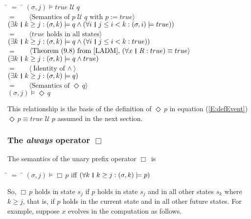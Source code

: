 \documentclass[fleqn, leqno]{article}
\newcommand{\lgap}{2pt}                             %
\newcommand{\mymathindent}{24pt}                    %
\newcommand{\Until}{\;\mathcal{U}\;}
\newcommand{\Event}{\Diamond\,}
\newcommand{\Always}{\Box\,}
\newcommand{\thedr}{\rule[-.25ex]{.32mm}{1.75ex}}   %
\newcommand{\dr}{\;\,\thedr\,\;}                    %
\newcommand{\rb}{:}                                 %
\newcommand{\all}{\forall}                          %
\newcommand{\ext}{\exists}                          %
\newcommand{\Gll} {\langle}                         %
\newcommand{\Ggg} {\rangle}                         %
\newcommand{\Hint}[1]     {\ \ \ $\Gll              \mbox{#1} \Ggg$ }   %
\begin{document}
\begin{tabbing}
\hspace{\mymathindent} \= $= \;$ \= \kill
	\> \>   $(\sigma, j) \models true\Until q$\\[\lgap]
	\> $=$  \>  \Hint{Semantics of $p\Until q$ with $p:=true$}\\[\lgap]
	\> \>   $(\ext k \dr k \ge j \rb (\sigma,k) \models q \land (\all i \dr j\le i < k \rb (\sigma,i) \models true))$\\[\lgap]
	\> $=$  \>  \Hint{$true$ holds in all states}\\[\lgap]
	\> \>   $(\ext k \dr k \ge j \rb (\sigma,k) \models q \land (\all i \dr j\le i < k \rb true))$\\[\lgap]
	\> $=$  \>  \Hint{Theorem (9.8) from \cite{LADM}, $(\all x\dr R\rb true)\equiv true$}\\[\lgap]
	\> \>   $(\ext k \dr k \ge j \rb (\sigma,k) \models q \land true)$\\[\lgap]
	\> $=$  \>  \Hint{Identity of $\land$}\\[\lgap]
	\> \>   $(\ext k \dr k \ge j \rb (\sigma,k) \models q)$\\[\lgap]
	\> $=$  \>  \Hint{Semantics of $\Event q$}\\[\lgap]
	\> \>   $(\sigma, j) \models \Event q$
\end{tabbing}

This relationship is the basis of the definition of $\Event p$ in equation (\ref{E:defEvent}) $\Event p \equiv true \Until p$
assumed in the next section.

\subsubsection*{The \textit{always} operator $\Always$}

The semantics of the unary prefix operator $\Always$ is

\begin{tabbing}
\hspace{\mymathindent} \= $= \;$ \= \kill
  \> $(\sigma, j) \models \Always p$ \quad iff \quad $(\all k \dr k \ge j \rb (\sigma,k) \models p)$
\end{tabbing}

So, $\Always p$ holds in state $s_j$ if $p$ holds in state $s_j$ and in all other states $s_k$ where $k\ge j$,
that is, if $p$ holds in the current state and in all other future states.
For example, suppose $x$ evolves in the computation as follows.\\
\end{document}
